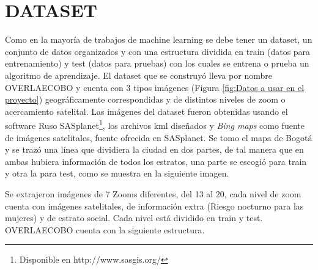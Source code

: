 
 \section{DATASET}
 Como en la mayoría de trabajos de machine learning se debe tener un dataset, un conjunto de datos organizados y con una estructura dividida en train (datos para entrenamiento) y test (datos para pruebas) con los cuales se entrena o prueba un algoritmo de aprendizaje. El dataset que se construyó lleva por nombre OVERLAECOBO y cuenta con 3 tipos imágenes (Figura \ref{fig:Datos a usar en el proyecto}) geográficamente correspondidas y de distintos niveles de zoom o acercamiento satelital. Las imágenes del dataset fueron obtenidas usando el software Ruso SASplanet\footnote[14]{Disponible en http://www.sasgis.org/}, los archivos kml diseñados y \textit{Bing maps} como fuente de imágenes satelitales, fuente ofrecida en SASplanet. Se tomo el mapa de Bogotá y se trazó una línea que dividiera la ciudad en dos partes, de tal manera que en ambas hubiera información de todos los estratos, una parte se escogió para train y otra la para test, como se muestra en la siguiente imagen.
 
 
  Se extrajeron imágenes de 7 Zooms diferentes, del 13 al 20,  cada nivel de zoom cuenta con imágenes satelitales, de información extra (Riesgo nocturno para las mujeres) y de estrato social. Cada nivel está dividido en train y test. OVERLAECOBO cuenta con la siguiente estructura.
 
 
